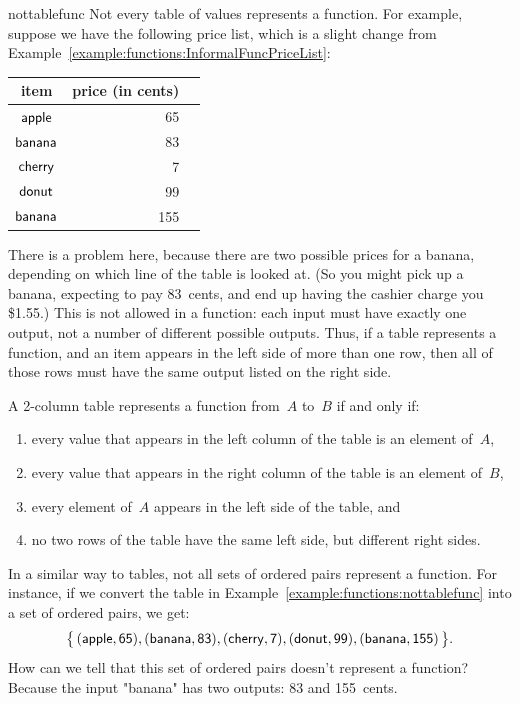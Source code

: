 \begin{example}{nottablefunc}
Not every table of values represents a function. For example, suppose we have the following price list, which is a slight change from Example~\ref{example:functions:InformalFuncPriceList}:

\begin{center}
\begin{tabular}{c|rr}
item &  price (in cents) \\ \hline

$\sf{apple}$ &  65 \\
$\sf{banana}$ & 83 \\
$\sf{cherry}$ & 7 \\
$\sf{donut}$ & 99 \\
$\sf{banana}$ & 155 \\
\end{tabular}
\end{center}
There is a problem here, because there are two possible prices for a banana, depending on which line of the table is looked at. (So you might pick up a banana, expecting to pay 83~cents, and end up having the cashier charge you \$1.55.) This is not allowed in a function: each input must have exactly one output, not a number of different possible outputs. Thus, if a table represents a function, and an item appears in the left side of more than one row, then all of those rows must have the same output listed on the right side.
\end{example}

\begin{rem}
A 2-column table represents a function from~$A$ to~$B$ if and only if:
\begin{enumerate}
\item every value that appears in the left column of the table is an element of~$A$,
\item every value that appears in the right column of the table is an element of~$B$,
\item every element of~$A$ appears in the left side of the table,
and
\item no two rows of the table have the same left side, but different right sides.
\end{enumerate}
\end{rem}

\noindent
In a similar way to tables, not all sets of ordered pairs represent a function.  For instance, if we convert the table in Example~\ref{example:functions:nottablefunc} into a set of ordered pairs, we get:
$$ \bigl\{\, (\sf{apple}, 65), 
 (\sf{banana}, 83), 
 (\sf{cherry}, 7),
  (\sf{donut}, 99), 
  (\sf{banana}, 155) \,\bigr\} .$$
How can we tell that this set of ordered pairs doesn't represent a function?  Because the input "banana" has two outputs:  83 and 155~cents.  

